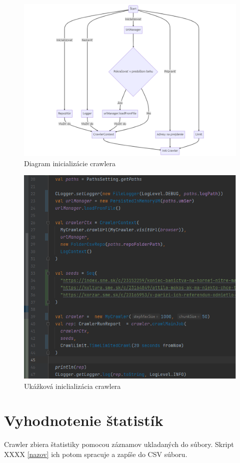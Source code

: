 \begin{figure}[!ht]
    \centering
    \includegraphics[width=1\textwidth]{figures/initChart.png}
    \caption{Diagram inicializácie crawlera\label{o:initChart}}
\end{figure}

\begin{figure}[!ht]
    \centering
    \includegraphics[width=.9\textwidth]{figures/crawlInit.png}
    \caption{Ukážková iniclializácia crawlera\label{o:initCrawl2}}
\end{figure}

\section{Vyhodnotenie štatistík}
Crawler zbiera štatistiky pomocou záznamov ukladaných do súbory. Skript XXXX \ref{nazov}  ich potom spracuje a zapíše do CSV súboru. 

